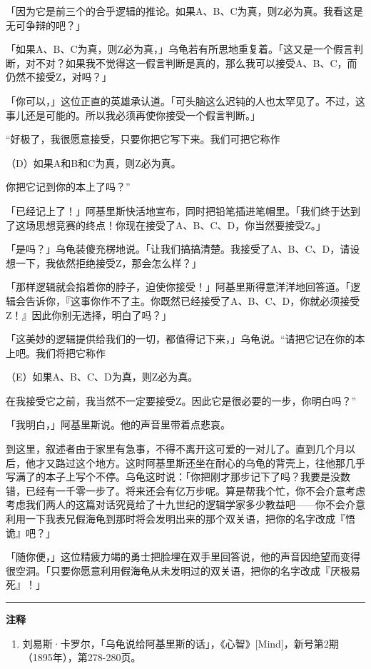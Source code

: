 \documentclass[
  12pt,
  twoside,
  openright,
  oldfontcommands,
]{memoir}
\begin{document}
「因为它是前三个的合乎逻辑的推论。如果A、B、C为真，则Z必为真。我看这是无可争辩的吧？」

「如果A、B、C为真，则Z必为真，」乌龟若有所思地重复着。「这又是一个假言判断，对不对？如果我不觉得这一假言判断是真的，那么我可以接受A、B、C，而仍然不接受Z，对吗？」

「你可以，」这位正直的英雄承认道。「可头脑这么迟钝的人也太罕见了。不过，这事儿还是可能的。所以我必须再使你接受一个假言判断。」

``好极了，我很愿意接受，只要你把它写下来。我们可把它称作

（D）如果A和B和C为真，则Z必为真。

你把它记到你的本上了吗？''

「已经记上了！」阿基里斯快活地宣布，同时把铅笔插进笔帽里。「我们终于达到了这场思想竞赛的终点！你现在接受了A、B、C、D，你当然要接受Z。」

「是吗？」乌龟装傻充楞地说。「让我们搞搞清楚。我接受了A、B、C、D，请设想一下，我依然拒绝接受Z，那会怎么样？」

「那样逻辑就会掐着你的脖子，迫使你接受！」阿基里斯得意洋洋地回答道。「逻辑会告诉你，『这事你作不了主。你既然已经接受了A、B、C、D，你就必须接受Z！』因此你别无选择，明白了吗？」

「这美妙的逻辑提供给我们的一切，都值得记下来，」乌龟说。``请把它记在你的本上吧。我们将把它称作

（E）如果A、B、C、D为真，则Z必为真。

在我接受它之前，我当然不一定要接受Z。因此它是很必要的一步，你明白吗？''

「我明白，」阿基里斯说。他的声音里带着点悲哀。

到这里，叙述者由于家里有急事，不得不离开这可爱的一对儿了。直到几个月以后，他才又路过这个地方。这时阿基里斯还坐在耐心的乌龟的背壳上，往他那几乎写满了的本子上写个不停。乌龟这时说：「你把刚才那步记下了吗？我要是没数错，已经有一千零一步了。将来还会有亿万步呢。算是帮我个忙，你不会介意考虑考虑我们两人的这篇对话究竟给了十九世纪的逻辑学家多少教益吧------你不会介意利用一下我表兄假海龟到那时将会发明出来的那个双关语，把你的名字改成『悟诡』吧？」

「随你便，」这位精疲力竭的勇士把脸埋在双手里回答说，他的声音因绝望而变得很空洞。「只要你愿意利用假海龟从未发明过的双关语，把你的名字改成『厌极易死』！」

{\footnotesize\setlength{\parindent}{0pt}%
\noindent\textcolor{rulegray}{\rule{0.35\linewidth}{0.3pt}}\par\vspace{2pt}
\noindent\textbf{注释}\par\vspace{3pt}
\begin{enumerate}
\label{fn:Dialog02-1}{}
\item 刘易斯·卡罗尔，「乌龟说给阿基里斯的话」，《心智》[Mind]，新号第2期（1895年），第278-280页。
\end{enumerate}
}
\end{document}
